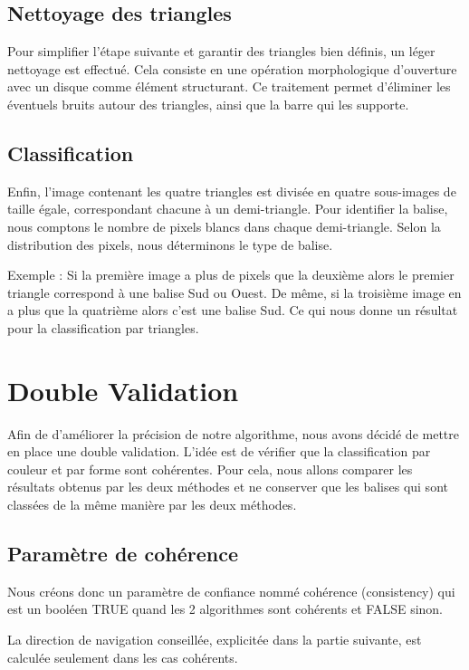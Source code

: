 \documentclass{article}
\begin{document}
\subsection{Nettoyage des triangles}

Pour simplifier l’étape suivante et garantir des triangles bien définis, un
léger nettoyage est effectué. Cela consiste en une opération morphologique
d’ouverture avec un disque comme élément structurant. Ce traitement permet
d’éliminer les éventuels bruits autour des triangles, ainsi que la barre qui
les supporte.

\subsection{Classification}

Enfin, l’image contenant les quatre triangles est divisée en quatre sous-images
de taille égale, correspondant chacune à un demi-triangle. Pour identifier la
balise, nous comptons le nombre de pixels blancs dans chaque demi-triangle.
Selon la distribution des pixels, nous déterminons le type de balise.

Exemple : Si la première image a plus de pixels que la deuxième alors le
premier triangle correspond à une balise Sud ou Ouest. De même, si la troisième
image en a plus que la quatrième alors c’est une balise Sud. Ce qui nous donne
un résultat pour la classification par triangles.

\section{Double Validation}

Afin de d'améliorer la précision de notre algorithme, nous avons décidé de
mettre en place une double validation. L'idée est de vérifier que la
classification par couleur et par forme sont cohérentes. Pour cela, nous allons
comparer les résultats obtenus par les deux méthodes et ne conserver que les
balises qui sont classées de la même manière par les deux méthodes.

\subsection{Paramètre de cohérence}
Nous créons donc un paramètre de confiance nommé cohérence (consistency) qui
est un booléen TRUE quand les 2 algorithmes sont cohérents et FALSE sinon.

La direction de navigation conseillée, explicitée dans la partie suivante, est
calculée seulement dans les cas cohérents.
\end{document}
